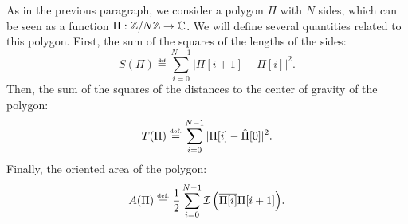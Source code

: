  
As in the previous paragraph, we consider a polygon $ \Pi $ with $ N $ sides, which can be seen as a function $ \Pi: \mathbb{Z}/N \mathbb{Z} \rightarrow \mathbb{C} $. We will define several quantities related to this polygon. First, the sum of the squares of the lengths of the sides:
\begin{equation*}
S (\Pi) \eqdef \sum_{i = 0}^{N-1}{| \Pi [i + 1] - \Pi [i] |^2}.
\end{equation*}
 Then, the sum of the squares of the distances to the center of gravity of the polygon:
\begin{equation*}
T (\Pi) \stackrel{\mbox{\upshape\tiny def.}}{=} \sum_{i = 0}^{N-1}{| \Pi [i] - \hat{\Pi}[0] |^2}.
\end{equation*}
Finally, the oriented area of the polygon:
\begin{equation*}
A (\Pi) \stackrel{\mbox{\upshape\tiny def.}}{=} \frac{1}{2} \sum_{i = 0}^{N-1}{\mathcal{I} \left(\overline{\Pi [i]} \Pi [i + 1] \right)}.
\end{equation*}
 
